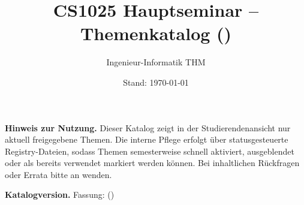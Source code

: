 \documentclass[a4paper,11pt]{article}
\title{CS1025 Hauptseminar -- Themenkatalog (\CatalogSemester)}
\author{Ingenieur-Informatik \textperiodcentered{} THM}
\date{Stand: \today}
\begin{document}
\maketitle

\noindent\textbf{Hinweis zur Nutzung.}
Dieser Katalog zeigt in der Studierendenansicht nur aktuell freigegebene Themen.
Die interne Pflege erfolgt über statusgesteuerte Registry-Dateien, sodass Themen semesterweise
schnell aktiviert, ausgeblendet oder als bereits verwendet markiert werden können.
Bei inhaltlichen Rückfragen oder Errata bitte an
\href{mailto:\CatalogContactEmail}{\CatalogContactEmail} wenden.

\vspace{0.75\baselineskip}
\noindent\textbf{Katalogversion.}
Fassung: \texttt{\CatalogVersion} (\CatalogSemester)



\tableofcontents
\clearpage







\end{document}
